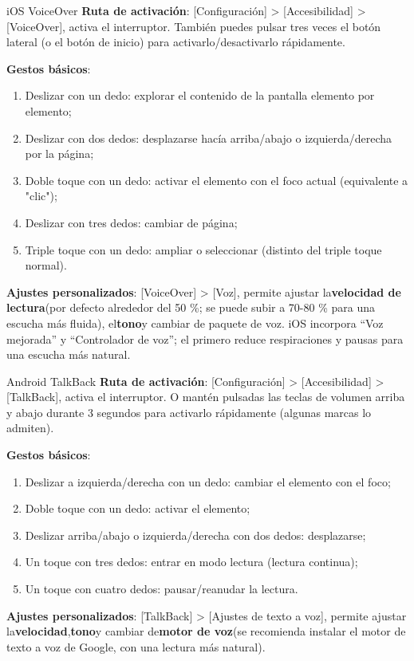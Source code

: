 \begin{tcbinfo}{iOS VoiceOver}
\textbf{Ruta de activación}: [Configuración] > [Accesibilidad] > [VoiceOver], activa el interruptor. También puedes pulsar tres veces el botón lateral (o el botón de inicio) para activarlo/desactivarlo rápidamente.

\textbf{Gestos básicos}:

\begin{enumerate}
  \item Deslizar con un dedo: explorar el contenido de la pantalla elemento por elemento;
  \item Deslizar con dos dedos: desplazarse hacía arriba/abajo o izquierda/derecha por la página;
  \item Doble toque con un dedo: activar el elemento con el foco actual (equivalente a "clic");
  \item Deslizar con tres dedos: cambiar de página;
  \item Triple toque con un dedo: ampliar o seleccionar (distinto del triple toque normal).
\end{enumerate}

\textbf{Ajustes personalizados}: [VoiceOver] > [Voz], permite ajustar la\textbf{velocidad de lectura}(por defecto alrededor del 50 \%; se puede subir a 70-80 \% para una escucha más fluida), el\textbf{tono}y cambiar de paquete de voz. iOS incorpora “Voz mejorada” y “Controlador de voz”; el primero reduce respiraciones y pausas para una escucha más natural.

\end{tcbinfo}

\begin{tcbinfo}{Android TalkBack}
\textbf{Ruta de activación}: [Configuración] > [Accesibilidad] > [TalkBack], activa el interruptor. O mantén pulsadas las teclas de volumen arriba y abajo durante 3 segundos para activarlo rápidamente (algunas marcas lo admiten).

\textbf{Gestos básicos}:

\begin{enumerate}
  \item Deslizar a izquierda/derecha con un dedo: cambiar el elemento con el foco;
  \item Doble toque con un dedo: activar el elemento;
  \item Deslizar arriba/abajo o izquierda/derecha con dos dedos: desplazarse;
  \item Un toque con tres dedos: entrar en modo lectura (lectura continua);
  \item Un toque con cuatro dedos: pausar/reanudar la lectura.
\end{enumerate}

\textbf{Ajustes personalizados}: [TalkBack] > [Ajustes de texto a voz], permite ajustar la\textbf{velocidad},\textbf{tono}y cambiar de\textbf{motor de voz}(se recomienda instalar el motor de texto a voz de Google, con una lectura más natural).

\end{tcbinfo}

